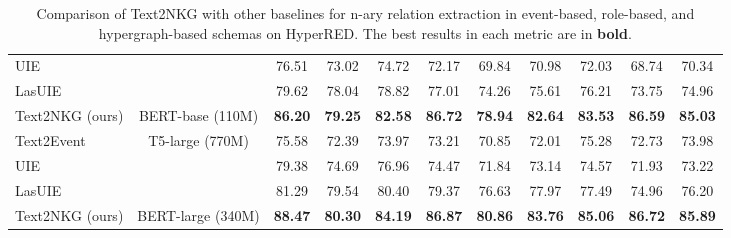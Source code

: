 \documentclass{article} \usepackage{iclr2024_conference,times}
\begin{document}
\begin{table*}[t]
{\begin{tabular}{lcccccccccc}
UIE                                                 &                                  & 76.51          & 73.02          & \multicolumn{1}{c|}{74.72}          & 72.17          & 69.84          & \multicolumn{1}{c|}{70.98}          & 72.03          & 68.74          & 70.34          \\
LasUIE                                              &                                  & 79.62          & 78.04          & \multicolumn{1}{c|}{78.82}          & 77.01          & 74.26          & \multicolumn{1}{c|}{75.61}          & 76.21          & 73.75          & 74.96          \\
Text2NKG (ours)                                     & BERT-base (110M)                 & \textbf{86.20} & \textbf{79.25} & \multicolumn{1}{c|}{\textbf{82.58}} & \textbf{86.72} & \textbf{78.94} & \multicolumn{1}{c|}{\textbf{82.64}} & \textbf{83.53} & \textbf{86.59} & \textbf{85.03} \\ \hline
Text2Event                                          & \multirow{3}{*}{T5-large (770M)} & 75.58          & 72.39          & \multicolumn{1}{c|}{73.97}          & 73.21          & 70.85          & \multicolumn{1}{c|}{72.01}          & 75.28          & 72.73          & 73.98           \\
UIE                                                 &                                  & 79.38          & 74.69          & \multicolumn{1}{c|}{76.96}          & 74.47          & 71.84          & \multicolumn{1}{c|}{73.14}          & 74.57          & 71.93          & 73.22          \\
LasUIE                                              &                                  & 81.29          & 79.54          & \multicolumn{1}{c|}{80.40}          & 79.37          & 76.63          & \multicolumn{1}{c|}{77.97}          & 77.49          & 74.96          & 76.20          \\
Text2NKG (ours)                                     & BERT-large (340M)                & \textbf{88.47} & \textbf{80.30} & \multicolumn{1}{c|}{\textbf{84.19}} & \textbf{86.87} & \textbf{80.86} & \multicolumn{1}{c|}{\textbf{83.76}} & \textbf{85.06} & \textbf{86.72} & \textbf{85.89} \\ \bottomrule
\end{tabular}
}
\caption{\label{t3}
Comparison of Text2NKG with other baselines for n-ary relation extraction in event-based, role-based, and hypergraph-based schemas on HyperRED. The best results in each metric are in \textbf{bold}. 
}
\end{table*}
\end{document}
